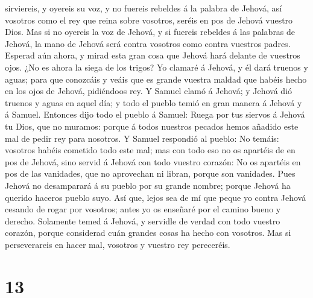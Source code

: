 sirviereis, y oyereis su voz, y no fuereis rebeldes á la palabra de
Jehová, así vosotros como el rey que reina sobre vosotros, seréis en pos
de Jehová vuestro Dios.  Mas si no oyereis la voz de
Jehová, y si fuereis rebeldes á las palabras de Jehová, la mano de
Jehová será contra vosotros como contra vuestros padres. 
Esperad aún ahora, y mirad esta gran cosa que Jehová hará delante de
vuestros ojos.  ¿No es ahora la siega de los trigos? Yo
clamaré á Jehová, y él dará truenos y aguas; para que conozcáis y veáis
que es grande vuestra maldad que habéis hecho en los ojos de Jehová,
pidiéndoos rey.  Y Samuel clamó á Jehová; y Jehová dió
truenos y aguas en aquel día; y todo el pueblo temió en gran manera á
Jehová y á Samuel.  Entonces dijo todo el pueblo á
Samuel: Ruega por tus siervos á Jehová tu Dios, que no muramos: porque á
todos nuestros pecados hemos añadido este mal de pedir rey para
nosotros.  Y Samuel respondió al pueblo: No temáis:
vosotros habéis cometido todo este mal; mas con todo eso no os apartéis
de en pos de Jehová, sino servid á Jehová con todo vuestro corazón:
 No os apartéis en pos de las vanidades, que no
aprovechan ni libran, porque son vanidades.  Pues Jehová
no desamparará á su pueblo por su grande nombre; porque Jehová ha
querido haceros pueblo suyo.  Así que, lejos sea de mí
que peque yo contra Jehová cesando de rogar por vosotros; antes yo os
enseñaré por el camino bueno y derecho.  Solamente temed
á Jehová, y servidle de verdad con todo vuestro corazón, porque
considerad cuán grandes cosas ha hecho con vosotros.  Mas
si perseverareis en hacer mal, vosotros y vuestro rey pereceréis.

\hypertarget{section-12}{%
\section{13}\label{section-12}}

